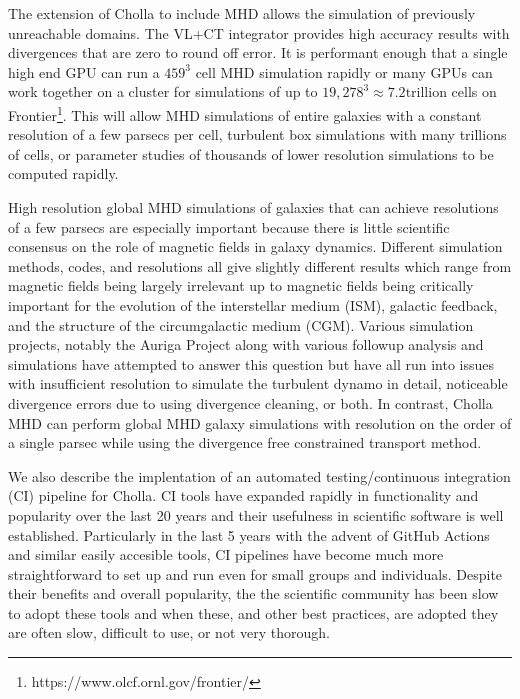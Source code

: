 The extension of Cholla to include MHD allows the simulation of previously unreachable domains. The VL+CT integrator provides high accuracy results with divergences that are zero to round off error. It is performant enough that a single high end GPU can run a $459^3$ cell MHD simulation rapidly or many GPUs can work together on a cluster for simulations of up to $19,278^3 \approx 7.2 \text{trillion}$ cells on Frontier\footnote{https://www.olcf.ornl.gov/frontier/}. This will allow MHD simulations of entire galaxies with a constant resolution of a few parsecs per cell, turbulent box simulations with many trillions of cells, or parameter studies of thousands of lower resolution simulations to be computed rapidly.

High resolution global MHD simulations of galaxies that can achieve resolutions of a few parsecs are especially important because there is little scientific consensus on the role of magnetic fields in galaxy dynamics. Different simulation methods, codes, and resolutions all give slightly different results which range from magnetic fields being largely irrelevant up to magnetic fields being critically important for the evolution of the interstellar medium (ISM), galactic feedback, and the structure of the circumgalactic medium (CGM)\citep{pakmor_faraday_2018,pakmor_simulations_2013,pakmor_magnetic_2017,pakmor_magnetizing_2020,ntormousi_dynamo_2020,van_de_voort_effect_2021}. Various simulation projects, notably the Auriga Project\citep{grand_auriga_2017} along with various followup analysis and simulations \citep{pakmor_faraday_2018,pakmor_simulations_2013,pakmor_magnetic_2017,pakmor_magnetizing_2020,ntormousi_dynamo_2020,van_de_voort_effect_2021} have attempted to answer this question but have all run into issues with insufficient resolution to simulate the turbulent dynamo in detail, noticeable divergence errors due to using divergence cleaning, or both. In contrast, Cholla MHD can perform global MHD galaxy simulations with resolution on the order of a single parsec while using the divergence free constrained transport method.

We also describe the implentation of an automated testing/continuous integration (CI) pipeline for Cholla. CI tools have expanded rapidly in functionality and popularity over the last 20 years and their usefulness in scientific software is well established\citep{beck_1999, wilson_2014,wilson_2017}. Particularly in the last 5 years with the advent of GitHub Actions and similar easily accesible tools, CI pipelines have become much more straightforward to set up and run even for small groups and individuals. Despite their benefits and overall popularity, the the scientific community has been slow to adopt these tools and when these, and other best practices, are adopted they are often slow, difficult to use, or not very thorough. 


